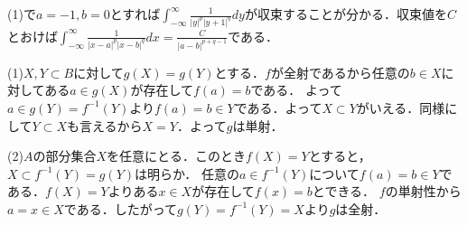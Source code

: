 \documentclass[
		book,
		head_space=20mm,
		foot_space=20mm,
		gutter=10mm,
		line_length=190mm
]{jlreq}
\begin{document}
(1)で$a=-1,b=0$とすれば$\int_{-\infty}^\infty \frac{1}{|y|^p|y+1|^q}dy$が収束することが分かる．収束値を$C$とおけば$\int_{-\infty}^\infty \frac{1}{|x-a|^p|x-b|^q}dx=\frac{C}{|a-b|^{p+q-1}}$である．

(1)$X,Y\subset B$に対して$g(X)=g(Y)$とする．$f$が全射であるから任意の$b\in X$に対してある$a\in g(X)$が存在して$f(a)=b$である．
よって$a\in g(Y)=f^{-1}(Y)$より$f(a)=b\in Y$である．よって$X\subset Y$がいえる．同様にして$Y\subset X$も言えるから$X=Y$．よって$g$は単射．

(2)$A$の部分集合$X$を任意にとる．このとき$f(X)=Y$とすると，$X\subset f^{-1}(Y)=g(Y)$は明らか．
任意の$a\in f^{-1}(Y)$について$f(a)=b\in Y$である．$f(X)=Y$よりある$x\in X$が存在して$f(x)=b$とできる．
$f$の単射性から$a=x\in X$である．したがって$g(Y)=f^{-1}(Y)=X$より$g$は全射．
\end{document}
